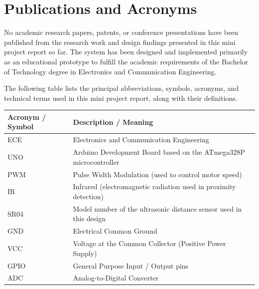 \documentclass[12pt,a4paper,oneside]{report}
\begin{document}
\chapter*{Publications and Acronyms}
\vspace{0.1in}
No academic research papers, patents, or conference presentations have been published from the research work and design findings presented in this mini project report so far. The system has been designed and implemented primarily as an educational prototype to fulfill the academic requirements of the Bachelor of Technology degree in Electronics and Communication Engineering.\par
\medskip
The following table lists the principal abbreviations, symbols, acronyms, and technical terms used in this mini project report, along with their definitions.\par
\vspace{0.1in}
\begin{center}
\fontsize{9.5}{11}\selectfont
\begin{tabular}{|C{3.0cm}|C{11.5cm}|}
\hline
\textbf{Acronym / Symbol} & \textbf{Description / Meaning} \\ \hline
ECE & Electronics and Communication Engineering \\ \hline
UNO & Arduino Development Board based on the ATmega328P microcontroller \\ \hline
PWM & Pulse Width Modulation (used to control motor speed) \\ \hline
IR & Infrared (electromagnetic radiation used in proximity detection) \\ \hline
SR04 & Model number of the ultrasonic distance sensor used in this design \\ \hline
GND & Electrical Common Ground \\ \hline
VCC & Voltage at the Common Collector (Positive Power Supply) \\ \hline
GPIO & General Purpose Input / Output pins \\ \hline
ADC & Analog-to-Digital Converter \\ \hline
\end{tabular}
\vspace{0.05in}
\label{tab:acronyms}
\end{center}
\clearpage

\begin{singlespace}
\begingroup
\titleformat{\chapter}[block]
  {\normalfont\fontsize{22}{26}\selectfont\bfseries\itshape\raggedright}
  {}{0pt}{}
\tableofcontents
\endgroup
\end{singlespace}
\clearpage
\end{document}
